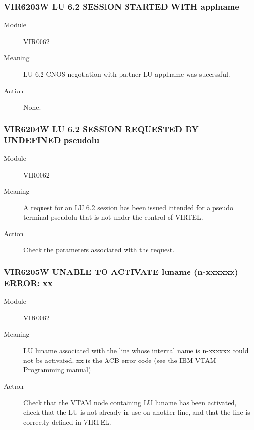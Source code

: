 \documentclass[letterpaper,10pt,english]{sphinxmanual}
\begin{document}
\subsubsection{VIR6203W LU 6.2 SESSION STARTED WITH applname}
\label{\detokenize{messages:vir6203w-lu-6-2-session-started-with-applname}}\begin{description}
\item[{Module}] \leavevmode
VIR0062

\item[{Meaning}] \leavevmode
LU 6.2 CNOS negotiation with partner LU applname was successful.

\item[{Action}] \leavevmode
None.

\end{description}


\subsubsection{VIR6204W LU 6.2 SESSION REQUESTED BY UNDEFINED pseudolu}
\label{\detokenize{messages:vir6204w-lu-6-2-session-requested-by-undefined-pseudolu}}\begin{description}
\item[{Module}] \leavevmode
VIR0062

\item[{Meaning}] \leavevmode
A request for an LU 6.2 session has been issued intended for a pseudo terminal pseudolu that is not under the control of VIRTEL.

\item[{Action}] \leavevmode
Check the parameters associated with the request.

\end{description}


\subsubsection{VIR6205W UNABLE TO ACTIVATE luname (n-xxxxxx) ERROR: xx}
\label{\detokenize{messages:vir6205w-unable-to-activate-luname-n-xxxxxx-error-xx}}\begin{description}
\item[{Module}] \leavevmode
VIR0062

\item[{Meaning}] \leavevmode
LU luname associated with the line whose internal name is n-xxxxxx could not be activated. xx is the ACB error code (see the IBM VTAM Programming manual)

\item[{Action}] \leavevmode
Check that the VTAM node containing LU luname has been activated, check that the LU is not already in use on another line, and that the line is correctly defined in VIRTEL.

\end{description}
\end{document}
